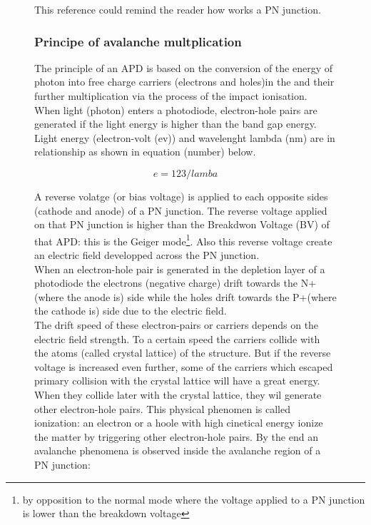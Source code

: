 \begin{figure}[!hbtp]
  This reference could remind the reader how works a PN junction.
  
  \subsubsection{Principe of avalanche multplication}
  
  The principle of an APD is based on the conversion of the energy of photon into free charge carriers (electrons and 
  holes)in the 
  and their further multiplication via the process of the impact ionisation. 
  \\
  When light (photon) enters a photodiode, electron-hole pairs are generated if 
  the light energy is higher than the band gap energy. Light energy (electron-volt (ev)) and wavelenght lambda (nm)
  are in relationship as shown in equation (number) below. 
  
  \begin{equation}
   e= 123/lamba
  \end{equation}
  
  A reverse volatge (or bias voltage) is applied to each opposite sides (cathode and anode) of a PN junction. The reverse voltage applied on that PN junction
  is higher than the Breakdwon Voltage (BV) of that 
  APD: this is the Geiger mode\footnote{by opposition to the normal mode where the voltage applied to a PN junction is 
  lower than the breakdown voltage}. 
  Also this reverse voltage create an electric field developped across the PN junction.\\
  When an electron-hole pair is generated in the depletion layer of a photodiode 
  the electrons (negative charge) drift towards the N+ (where the anode is) side while the holes drift towards the P+(where the cathode is)
  side due to the electric field. 
  \\
  
  The drift speed of these electron-pairs or carriers depends on the electric field strength. To a certain speed
  the carriers collide with the atoms (called crystal lattice) of the structure. But if the reverse voltage is increased even further, 
  some of the carriers which escaped primary collision with the crystal lattice will have a great energy.\\
  When they collide later with the crystal lattice, they wil generate other electron-hole pairs. This physical phenomen is called ionization:
  an electron or a hoole with high cinetical energy ionize the matter by triggering other electron-hole pairs. 
  By the end an avalanche phenomena is observed inside the avalanche region of a PN junction:
  

\end{figure}
